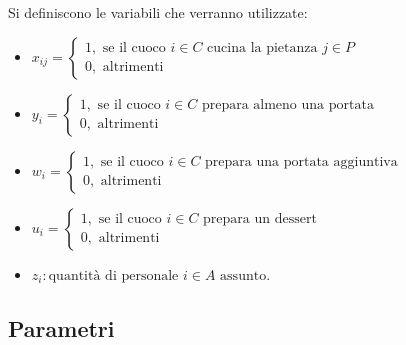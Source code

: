 \documentclass[../modello-progetto.tex]{subfiles}
\begin{document}
Si definiscono le variabili che verranno utilizzate:
\begin{itemize}
	\item $x_{ij} =\begin{cases} 1, \mbox{ se il cuoco }  i \in C \mbox{ cucina la pietanza } j \in P \\ 0, \mbox{ altrimenti} \end{cases} $
	\item $y_i =\begin{cases} 1, \mbox{ se il cuoco }  i \in C \mbox{ prepara almeno una portata }\\ 0, \mbox{ altrimenti} \end{cases}$
	\item $w_i =\begin{cases} 1, \mbox{ se il cuoco }  i \in C \mbox{ prepara una portata aggiuntiva}\\ 0, \mbox{ altrimenti} \end{cases}$
	\item $u_i =\begin{cases} 1, \mbox{ se il cuoco }  i \in C \mbox{ prepara un dessert }\\ 0, \mbox{ altrimenti} \end{cases}$
	\item $z_i : \mbox{quantità di personale } i \in A \mbox{ assunto}$.
\end{itemize}

\subsection{Parametri}
\label{sub:parametri}
\end{document}
